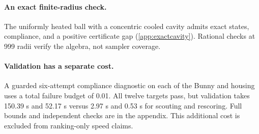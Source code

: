 \paragraph{An exact finite-radius check.}
The uniformly heated ball with a concentric cooled cavity admits exact
states, compliance, and a positive certificate gap (\cref{app:exactcavity}).
Rational checks at 999 radii verify the algebra, not sampler coverage.

\paragraph{Validation has a separate cost.}
A guarded six-attempt compliance diagnostic on each of the Bunny and housing
uses a total failure budget of 0.01. All twelve targets pass, but validation
takes 150.39 s and 52.17 s versus 2.97 s and 0.53 s for scouting and rescoring.
Full bounds and independent checks are in the appendix. This additional
cost is excluded from ranking-only speed claims.
